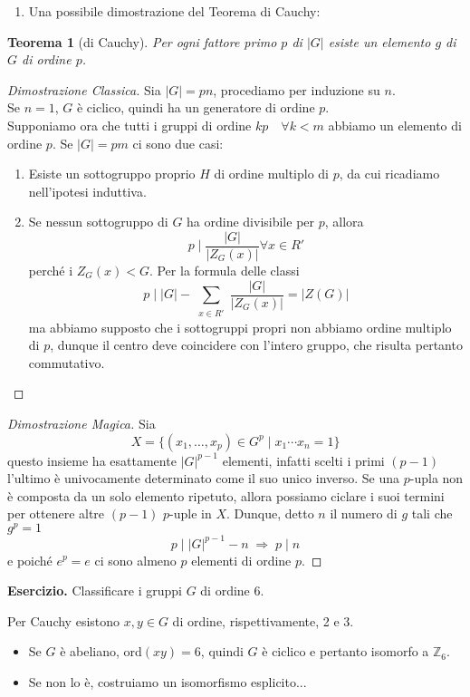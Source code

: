 \documentclass[a4paper]{article}
\newtheorem{theorem}{Teorema}[section]
\theoremstyle{remark}
\theoremstyle{definition}
\begin{document}
\begin{multicols}{2}
\begin{enumerate}
	\item Una possibile dimostrazione del Teorema di Cauchy:
\end{enumerate}

\begin{theorem}[di Cauchy] \label{cauchy}
	Per ogni fattore primo $ p $ di $ |G| $ esiste un elemento $ g $ di $ G $ di ordine $ p $.
\end{theorem}
\begin{proof}[Dimostrazione Classica]
	Sia $ |G|= pn $, procediamo per induzione su $ n $. \\
	Se $ n = 1 $, $ G $ è ciclico, quindi ha un generatore di ordine $ p $. \\
	Supponiamo ora che tutti i gruppi di ordine $ kp  \quad\forall k < m$ abbiamo un elemento di ordine $ p $. Se $ |G|=pm $ ci sono due casi:
	\begin{enumerate}
		\item Esiste un sottogruppo proprio $ H $ di ordine multiplo di $ p $, da cui ricadiamo nell'ipotesi induttiva.
		\item Se nessun sottogruppo di $ G $ ha ordine divisibile per $ p $, allora
		\[ p \mid \frac{|G|}{|Z_G(x)|} \forall x \in R' \] perché i $ Z_G(x) < G $. Per la formula delle classi
		\[ p \mid |G| - \sum_{\substack{x \in R'}} \frac{|G|}{|Z_G(x)|} = |Z(G)| \]
		ma abbiamo supposto che i sottogruppi propri non abbiamo ordine multiplo di $ p $, dunque il centro deve coincidere con l'intero gruppo, che risulta pertanto commutativo.
	\end{enumerate}
\end{proof}
\begin{proof}[Dimostrazione Magica]
	Sia $$ X = \{(x_1, \dots, x_p) \in G^p \mid x_1\cdots x_n = 1 \} $$ questo insieme ha esattamente $ |G|^{p-1} $ elementi, infatti scelti i primi $ (p-1) $ l'ultimo è univocamente determinato come il suo unico inverso. Se una $ p $-upla non è composta da un solo elemento ripetuto, allora possiamo ciclare i suoi termini per ottenere altre $ (p-1) $ $ p $-uple in $ X $. Dunque, detto $ n $ il numero di $ g $ tali che $ g^p = 1 $ \[ p \mid |G|^{p-1} - n \;\Rightarrow\; p \mid n \] e poiché $ e^p = e $ ci sono almeno $ p $ elementi di ordine $ p $.
\end{proof}



\textbf{Esercizio.} Classificare i gruppi $ G $ di ordine $ 6 $.

Per Cauchy esistono $ x, y \in G $ di ordine, rispettivamente, 2 e 3.
\begin{itemize}
	\item Se $ G $ è abeliano, ord$ (xy) = 6 $, quindi $ G $ è ciclico e pertanto isomorfo a $ \mathbb{Z}_6 $.
	\item Se non lo è, costruiamo un isomorfismo esplicito...
\end{itemize}


\end{multicols}
\end{document}
